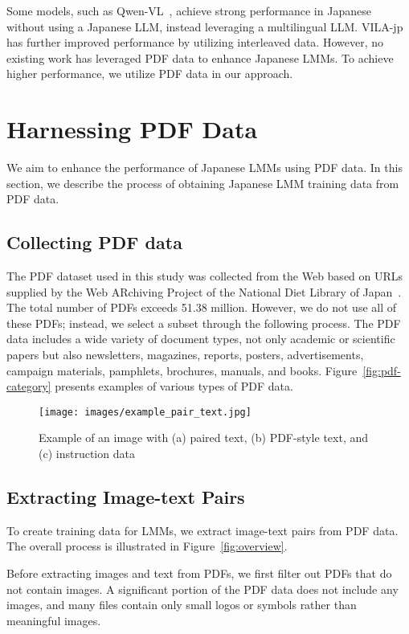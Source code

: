 Some models, such as Qwen-VL~\cite{bai2023qwen}, achieve strong performance in Japanese without using a Japanese LLM, instead leveraging a multilingual LLM.
VILA-jp~\cite{VILAjp} has further improved performance by utilizing interleaved data.
However, no existing work has leveraged PDF data to enhance Japanese LMMs.
To achieve higher performance, we utilize PDF data in our approach.


\section{Harnessing PDF Data}\label{sec:PDF}
We aim to enhance the performance of Japanese LMMs using PDF data.
In this section, we describe the process of obtaining Japanese LMM training data from PDF data.


\subsection{Collecting PDF data}
The PDF dataset used in this study was collected from the Web based on URLs supplied by the Web ARchiving Project of the National Diet Library of Japan~\cite{NDL_WARP}.
The total number of PDFs exceeds 51.38 million.
However, we do not use all of these PDFs; instead, we select a subset through the following process.
The PDF data includes a wide variety of document types, not only academic or scientific papers but also newsletters, magazines, reports, posters, advertisements, campaign materials, pamphlets, brochures, manuals, and books.
Figure~\ref{fig:pdf-category} presents examples of various types of PDF data.


\begin{figure*}[t]
  \centering
  \texttt{[image: images/example\_pair\_text.jpg]}
  \vspace{-4mm}
  \caption{Example of an image with (a) paired text, (b) PDF-style text, and (c) instruction data}
  \label{fig:examples-text}
\end{figure*}

\subsection{Extracting Image-text Pairs}\label{subsec:extract-image-text}
To create training data for LMMs, we extract image-text pairs from PDF data.
The overall process is illustrated in Figure~\ref{fig:overview}.

Before extracting images and text from PDFs, we first filter out PDFs that do not contain images.
A significant portion of the PDF data does not include any images, and many files contain only small logos or symbols rather than meaningful images.


